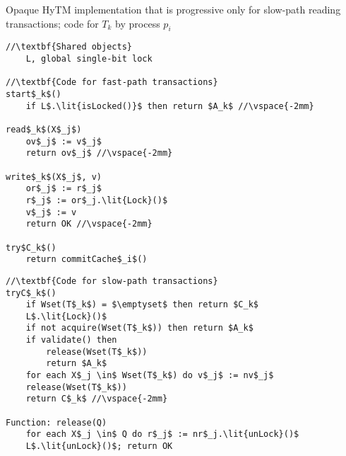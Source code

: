 \begin{algorithm*}[!t]
\caption{Opaque HyTM implementation that is progressive only for slow-path reading transactions; code for $T_k$ by process $p_i$}
\label{alg:inswrite2}
\vspace{-2mm}
\noindent\lstset{style=customc}
\begin{minipage}{0.49\textwidth}
\begin{lstlisting}[frame=none,firstnumber=1,mathescape=true]
//\textbf{Shared objects}
    L, global single-bit lock

//\textbf{Code for fast-path transactions}
start$_k$()
    if L$.\lit{isLocked()}$ then return $A_k$ //\vspace{-2mm}

read$_k$(X$_j$)
    ov$_j$ := v$_j$ 
    return ov$_j$ //\vspace{-2mm}

write$_k$(X$_j$, v)
    or$_j$ := r$_j$ 
    r$_j$ := or$_j.\lit{Lock}()$ 
    v$_j$ := v 
    return OK //\vspace{-2mm}

try$C_k$()
    return commitCache$_i$() 
\end{lstlisting}
\end{minipage}
\begin{minipage}{0.49\textwidth}
\begin{lstlisting}[frame=none,firstnumber=last,mathescape=true]
//\textbf{Code for slow-path transactions}
tryC$_k$()
    if Wset(T$_k$) = $\emptyset$ then return $C_k$
    L$.\lit{Lock}()$
    if not acquire(Wset(T$_k$)) then return $A_k$
    if validate() then
        release(Wset(T$_k$))
        return $A_k$
    for each X$_j \in$ Wset(T$_k$) do v$_j$ := nv$_j$
    release(Wset(T$_k$))
    return C$_k$ //\vspace{-2mm}
    
Function: release(Q)
    for each X$_j \in$ Q do r$_j$ := nr$_j.\lit{unLock}()$
    L$.\lit{unLock}()$; return OK
\end{lstlisting}
\end{minipage}
\vspace{-2mm}
\end{algorithm*}
